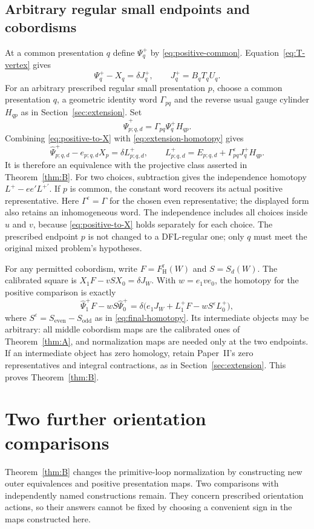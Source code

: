 \documentclass[11pt]{amsart}
\theoremstyle{definition}
\theoremstyle{remark}
\theoremstyle{plain}
\newcommand{\eps}{\varepsilon}
\newcommand{\FH}{F_{\mathrm H}}
\begin{document}
\subsection{Arbitrary regular small endpoints and cobordisms}
At a common presentation $q$ define $\Psi_q^+$ by
\eqref{eq:positive-common}. Equation~\eqref{eq:T-vertex} gives
\begin{equation}\label{eq:positive-to-X}
 \Psi_q^+-X_q=\delta J_q^+,\qquad J_q^+=B_qT_qU_q.
\end{equation}
For an arbitrary prescribed regular small presentation $p$, choose
a common presentation $q$, a geometric identity word $\Gamma_{pq}$
and the reverse usual gauge cylinder $H_{qp}$ as in
Section~\ref{sec:extension}. Set
\[
 \widehat\Psi^+_{p;q,d}=\Gamma_{pq}\Psi_q^+H_{qp}.
\]
Combining \eqref{eq:positive-to-X} with
\eqref{eq:extension-homotopy} gives
\begin{equation}\label{eq:positive-extension}
 \widehat\Psi^+_{p;q,d}-e_{p;q,d}X_p=\delta L_{p;q,d}^+,
 \qquad L_{p;q,d}^+=E_{p;q,d}+\Gamma_{pq}^\eps J_q^+H_{qp}.
\end{equation}
It is therefore an equivalence with the projective class asserted
in Theorem~\ref{thm:B}. For two choices, subtraction gives the
independence homotopy $L^+-ee'L^{+\prime}$. If $p$ is common,
the constant word recovers its actual positive representative.
Here $\Gamma^\eps=\Gamma$ for the chosen even representative;
the displayed form also retains an inhomogeneous word. The
independence includes all choices inside $u$ and $v$, because
\eqref{eq:positive-to-X} holds separately for each choice.
The prescribed endpoint $p$ is not changed to a DFL-regular one;
only $q$ must meet the original mixed problem's hypotheses.

For any permitted cobordism, write
$F=\FH^{\mathrm r}(W)$ and $S=S_d(W)$. The calibrated square
is $X_1F-vSX_0=\delta J_W$. With $w=e_1ve_0$, the homotopy
for the positive comparison is exactly
\[
 \widehat\Psi_1^+F-wS\widehat\Psi_0^+
 =\delta\bigl(e_1J_W+L_1^+F-wS^\eps L_0^+\bigr),
\]
where $S^\eps=S_{\mathrm{even}}-S_{\mathrm{odd}}$ as in
\eqref{eq:final-homotopy}. Its intermediate objects may be
arbitrary: all middle cobordism maps are the calibrated ones of
Theorem~\ref{thm:A}, and normalization maps are needed only at the two endpoints.
If an intermediate object has zero homology, retain Paper~II's
zero representatives and integral contractions, as in
Section~\ref{sec:extension}. This proves Theorem~\ref{thm:B}.

\section{Two further orientation comparisons}\label{sec:questions}
Theorem~\ref{thm:B} changes the primitive-loop normalization by
constructing new outer equivalences and positive presentation
maps. Two comparisons with independently named constructions
remain. They concern prescribed orientation actions, so their
answers cannot be fixed by choosing a convenient sign in the
maps constructed here.
\end{document}
